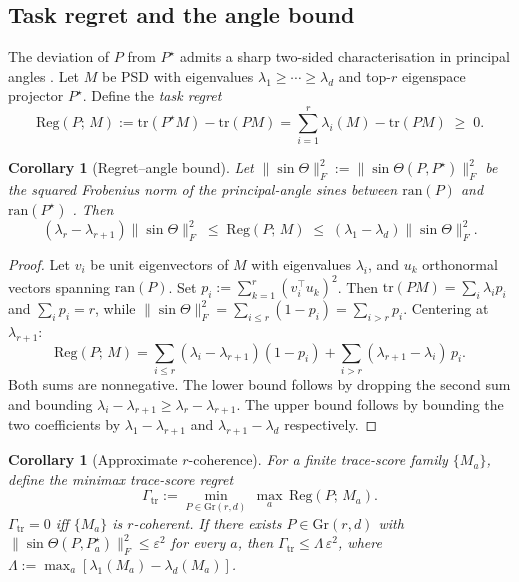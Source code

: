 \documentclass[final,3p,times]{elsarticle}
\newtheorem{corollary}[theorem]{Corollary}
\newcommand{\Gr}{\mathrm{Gr}}
\newcommand{\tr}{\mathrm{tr}}
\newcommand{\ran}{\mathrm{ran}}
\newcommand{\Reg}{\mathrm{Reg}}
\begin{document}
\subsection{Task regret and the angle bound}

The deviation of $P$ from $P^\star$ admits a sharp two-sided
characterisation in principal angles \cite{BjorckGolub1973}.
Let $M$ be PSD with eigenvalues $\lambda_1\ge\cdots\ge\lambda_d$ and
top-$r$ eigenspace projector $P^\star$.
Define the \emph{task regret}
\begin{equation}\label{eq:regret}
\Reg(P;\,M) := \tr(P^\star M) - \tr(P M)
= \sum_{i=1}^r\lambda_i(M)-\tr(P M)\;\ge\;0.
\end{equation}

\begin{corollary}[Regret--angle bound]\label{cor:regretbound}
Let $\|\sin\Theta\|_F^2 := \|\sin\Theta(P,P^\star)\|_F^2$ be the squared
Frobenius norm of the principal-angle sines between $\ran(P)$ and
$\ran(P^\star)$ \cite{BjorckGolub1973,DavisKahan1970,Stewart1990}.
Then
\begin{equation}\label{eq:regretbound}
(\lambda_r-\lambda_{r+1})\|\sin\Theta\|_F^2
\;\le\;\Reg(P;\,M)\;\le\;
(\lambda_1-\lambda_d)\|\sin\Theta\|_F^2.
\end{equation}
\end{corollary}

\begin{proof}
Let $v_i$ be unit eigenvectors of $M$ with eigenvalues $\lambda_i$, and
$u_k$ orthonormal vectors spanning $\ran(P)$.
Set $p_i:=\sum_{k=1}^r(v_i^\top u_k)^2$.
Then $\tr(PM)=\sum_i\lambda_i p_i$ and $\sum_i p_i=r$, while
$\|\sin\Theta\|_F^2=\sum_{i\le r}(1-p_i)=\sum_{i>r}p_i$.
Centering at $\lambda_{r+1}$:
\[
\Reg(P;\,M)
=\sum_{i\le r}(\lambda_i-\lambda_{r+1})(1-p_i)
+\sum_{i>r}(\lambda_{r+1}-\lambda_i)\,p_i.
\]
Both sums are nonnegative.
The lower bound follows by dropping the second sum and bounding
$\lambda_i-\lambda_{r+1}\ge\lambda_r-\lambda_{r+1}$.
The upper bound follows by bounding the two coefficients by $\lambda_1
-\lambda_{r+1}$ and $\lambda_{r+1}-\lambda_d$ respectively.
\end{proof}

\begin{corollary}[Approximate $r$-coherence]\label{cor:approxcoh}
For a finite trace-score family $\{M_a\}$, define the \emph{minimax
trace-score regret}
\begin{equation}\label{eq:gamma}
\Gamma_{\mathrm{tr}}
:= \min_{P\in\Gr(r,d)}\,\max_a\,\Reg(P;\,M_a).
\end{equation}
$\Gamma_{\mathrm{tr}}=0$ iff $\{M_a\}$ is $r$-coherent.
If there exists $P\in\Gr(r,d)$ with $\|\sin\Theta(P,P_a^\star)\|_F^2
\le\varepsilon^2$ for every $a$, then
$\Gamma_{\mathrm{tr}}\le\Lambda\,\varepsilon^2$, where
$\Lambda:=\max_a[\lambda_1(M_a)-\lambda_d(M_a)]$.
\end{corollary}
\end{document}
